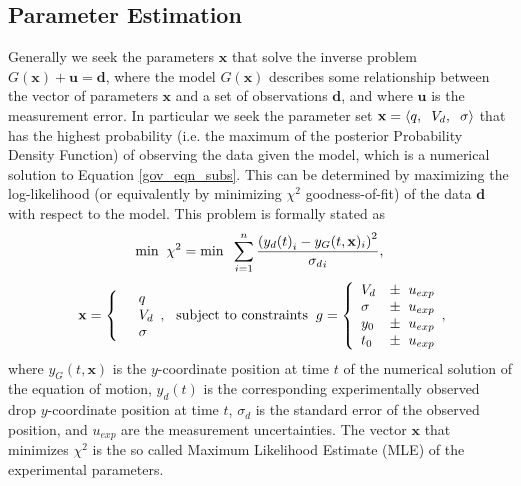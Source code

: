 \documentclass[aip,reprint, floatfix]{revtex4-1}
\begin{document}
\subsection{Parameter Estimation}
Generally we seek the parameters $\mathbf{x}$ that solve the inverse problem $G(\mathbf{x}) + \mathbf{u} = \mathbf{d}$, where the model $G(\mathbf{x})$ describes some relationship between the vector of parameters $\mathbf{x}$ and a set of observations $\mathbf{d}$, and where $\mathbf{u}$ is the measurement error. In particular we seek the parameter set $\mathbf{x} = \left\langle q, \hspace{2 mm} V_d, \hspace{2 mm} \sigma \right\rangle$ that has the highest probability (i.e. the maximum of the posterior Probability Density Function) of observing the data given the model, which is a numerical solution to Equation \ref{gov_eqn_subs}. This can be determined by maximizing the log-likelihood (or equivalently by minimizing $\chi^2$ goodness-of-fit) of the data $\mathbf{d}$ with respect to the model. This problem is formally stated as  
\[
\mbox{min} \hspace{2 mm} \chi^2 = \mbox{min} \hspace{2 mm} \sum^n_{i=1} \frac{\left({y_d(t)}_i - y_G(t, \mathbf{x})_i \right)^2}{{\sigma_d}_i},
\]
\begin{eqnarray*} \mbox{} \hspace{2 mm} \begin{split} \mathbf{x} = \left\{ \begin{array}{ll}      & q\\
		  &	V_d\\
          & \sigma 
          \end{array}, \right. 
          \end{split} \hspace{2 mm} \mbox{subject to constraints} \hspace{2 mm} \begin{split}
          g = \left\{ \begin{array}{ll}
           V_d &\pm \hspace{2 mm} u_{exp}\\
      	   \sigma &\pm  \hspace{2 mm} u_{exp}\\
      	   y_0 &\pm \hspace{2 mm} u_{exp}\\
      	   t_0 &\pm \hspace{2 mm} u_{exp}\\
          \end{array}, \right. 
          \end{split}
\end{eqnarray*}
where $y_G(t, \mathbf{x})$ is the $y$-coordinate position at time $t$ of the numerical solution of the equation of motion, $y_d(t)$ is the corresponding experimentally observed drop $y$-coordinate position at time $t$, $\sigma_d$ is the standard error of the observed position, and $u_{exp}$ are the measurement uncertainties. The vector $\mathbf{x}$ that minimizes $\chi^2$ is the so called Maximum Likelihood Estimate (MLE) of the experimental parameters.
\end{document}
